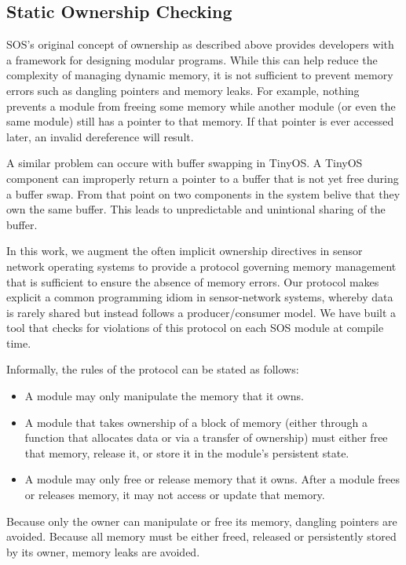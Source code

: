 
\subsection{Static Ownership Checking}

SOS's original concept of ownership as described above provides
developers with a framework for designing modular programs. While this
can help reduce the complexity of managing dynamic memory, it is not
sufficient to prevent memory errors such as dangling pointers and
memory leaks.  For example, nothing prevents a module from freeing
some memory while another module (or even the same module) still has a
pointer to that memory.  If that pointer is ever accessed later, an
invalid dereference will result.  

A similar problem can occure with buffer swapping in TinyOS.  A TinyOS
component can improperly return a pointer to a buffer that is not yet
free during a buffer swap.  From that point on two components in the
system belive that they own the same buffer.  This leads to
unpredictable and unintional sharing of the buffer.

%
%

In this work, we augment the often implicit ownership directives in
sensor network operating systems to provide a protocol governing
memory management that is sufficient to ensure the absence of memory
errors.  Our protocol makes explicit a common programming idiom in
sensor-network systems, whereby data is rarely shared but instead
follows a producer/consumer model.  We have built a tool that checks
for violations of this protocol on each SOS module at compile time.

Informally, the rules of the protocol can be stated as follows:
%
\begin{itemize}
%
\item A module may only manipulate the memory that it owns.
%
\item A module that takes ownership of a block of memory (either
through a function that allocates data or via a transfer of ownership)
must either free that memory, release it, or store it in the module's
persistent state.
%
\item A module may only free or release memory that it owns.  After a
module frees or releases memory, it may not access or update that
memory.
%
\end{itemize}
%
Because only the owner can manipulate or free its memory, dangling
pointers are avoided.  Because all memory must be either freed,
released or persistently stored by its owner, memory leaks are
avoided.


